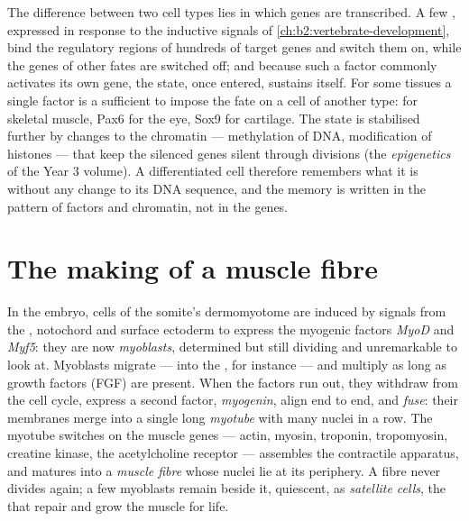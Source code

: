 \begin{proposition}\label{prop:b2:cell-differentiation:transcriptional}
The difference between two cell types lies in which genes are
transcribed. A few \emph{}, expressed in
response to the inductive signals of
\cref{ch:b2:vertebrate-development}, bind the regulatory regions of
hundreds of target genes and switch them on, while the genes of
other fates are switched off; and because such a factor commonly
activates its own gene, the state, once entered, sustains itself.
For some tissues a single factor is a \emph{}
sufficient to impose the fate on a cell of another type:  for
skeletal muscle, Pax6 for the eye, Sox9 for cartilage. The state is
stabilised further by changes to the chromatin --- methylation of
DNA, modification of histones --- that keep the silenced genes
silent through divisions (the \emph{epigenetics} of the Year 3
volume). A differentiated cell therefore remembers what it is
without any change to its DNA sequence, and the memory is written
in the pattern of factors and chromatin, not in the genes.
\end{proposition}

\section{The making of a muscle fibre}

\begin{definition}[Myogenesis]\label{def:b2:cell-differentiation:myogenesis}
In the embryo, cells of the somite's dermomyotome are induced by
signals from the , notochord and surface ectoderm to
express the myogenic factors \emph{MyoD} and \emph{Myf5}: they are
now \emph{myoblasts}, determined but still dividing and unremarkable
to look at. Myoblasts migrate --- into the , for instance
--- and multiply as long as growth factors (FGF) are present. When
the factors run out, they withdraw from the cell cycle, express a
second factor, \emph{myogenin}, align end to end, and \emph{fuse}:
their membranes merge into a single long \emph{myotube} with many
nuclei in a row. The myotube switches on the muscle genes ---
actin, myosin, troponin, tropomyosin, creatine kinase, the
acetylcholine receptor --- assembles the contractile apparatus, and
matures into a \emph{muscle fibre} whose nuclei lie at its
periphery. A fibre never divides again; a few myoblasts remain
beside it, quiescent, as \emph{satellite cells}, the 
that repair and grow the muscle for life.
\end{definition}

